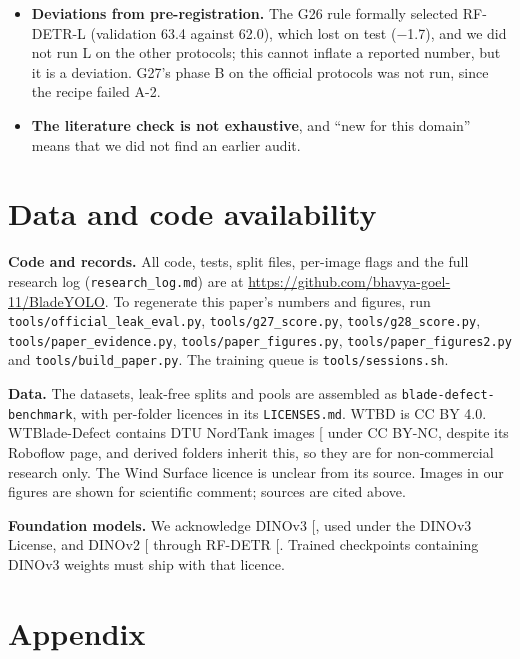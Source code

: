 \documentclass[
  10pt,
]{article}
\begin{document}
\begin{itemize}
  \textbf{Claims about modules are for our components.} BladeYOLO's own
  modules were not rerun on a leak-free split after the code audit.
\item
  \textbf{Deviations from pre-registration.} The G26 rule formally
  selected RF-DETR-L (validation 63.4 against 62.0), which lost on test
  (−1.7), and we did not run L on the other protocols; this cannot
  inflate a reported number, but it is a deviation. G27's phase B on the
  official protocols was not run, since the recipe failed A-2.
\item
  \textbf{The literature check is not exhaustive}, and ``new for this
  domain'' means that we did not find an earlier audit.
\end{itemize}

\section{Data and code availability}\label{sec:availability}

\textbf{Code and records.} All code, tests, split files, per-image flags
and the full research log (\texttt{research\_log.md}) are at
\url{https://github.com/bhavya-goel-11/BladeYOLO}. To regenerate this
paper's numbers and figures, run \texttt{tools/official\_leak\_eval.py},
\texttt{tools/g27\_score.py}, \texttt{tools/g28\_score.py},
\texttt{tools/paper\_evidence.py}, \texttt{tools/paper\_figures.py},
\texttt{tools/paper\_figures2.py} and \texttt{tools/build\_paper.py}.
The training queue is \texttt{tools/sessions.sh}.

\textbf{Data.} The datasets, leak-free splits and pools are assembled as
\texttt{blade-defect-benchmark}, with per-folder licences in its
\texttt{LICENSES.md}. WTBD is CC BY 4.0. WTBlade-Defect contains DTU
NordTank images {[}\citeproc{ref-shihavuddin}{5}{]} under CC BY-NC,
despite its Roboflow page, and derived folders inherit this, so they are
for non-commercial research only. The Wind Surface licence is unclear
from its source. Images in our figures are shown for scientific comment;
sources are cited above.

\textbf{Foundation models.} We acknowledge DINOv3
{[}\citeproc{ref-dinov3}{21}{]}, used under the DINOv3 License, and
DINOv2 {[}\citeproc{ref-dinov2}{19}{]} through RF-DETR
{[}\citeproc{ref-rfdetr}{18}{]}. Trained checkpoints containing DINOv3
weights must ship with that licence.

\section*{Appendix}\label{appendix}
\end{document}
